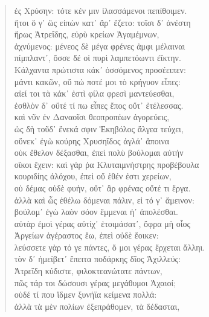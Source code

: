 \begin{Spacing}{1.5}
\begin{verse}
{\large\g  ἐς Χρύσην: τότε κέν μιν ἱλασσάμενοι πεπίθοιμεν.  } \\
{\large\g  ἤτοι ὅ γ᾽ ὣς εἰπὼν κατ᾽ ἄρ᾽ ἕζετο: τοῖσι δ᾽ ἀνέστη  } \\
{\large\g  ἥρως Ἀτρεΐδης, εὐρὺ κρείων Ἀγαμέμνων,  } \\
{\large\g  ἀχνύμενος: μένεος δὲ μέγα φρένες ἀμφι μέλαιναι  } \\
{\large\g  πίμπλαντ᾽, ὄσσε δέ οἱ πυρὶ λαμπετόωντι ἐΐκτην.  } \\
{\large\g  Κάλχαντα πρώτιστα κάκ᾽ ὀσσόμενος προσέειπεν:  } \\
{\large\g  μάντι κακῶν, οὔ πώ ποτέ μοι τὸ κρήγυον εἶπες:  } \\
{\large\g  αἰεί τοι τὰ κάκ᾽ ἐστὶ φίλα φρεσὶ μαντεύεσθαι,  } \\
{\large\g  ἐσθλὸν δ᾽ οὔτέ τί πω εἶπες ἔπος οὔτ᾽ ἐτέλεσσας.  } \\
{\large\g  καὶ νῦν ἐν Δαναοῖσι θεοπροπέων ἀγορεύεις,  } \\
{\large\g  ὡς δὴ τοῦδ᾽ ἕνεκά σφιν Ἑκηβόλος ἄλγεα τεύχει,  } \\
{\large\g  οὕνεκ᾽ ἐγὼ κούρης Χρυσηΐδος ἀγλά᾽ ἄποινα  } \\
{\large\g  οὐκ ἔθελον δέξασθαι, ἐπεὶ πολὺ βούλομαι αὐτήν  } \\
{\large\g  οἴκοι ἔχειν: καὶ γάρ ῥα Κλυταιμνήστρης προβέβουλα  } \\
{\large\g  κουριδίης ἀλόχου, ἐπεὶ οὔ ἑθέν ἐστι χερείων,  } \\
{\large\g  οὐ δέμας οὐδὲ φυήν, οὔτ᾽ ἂρ φρένας οὔτέ τι ἔργα.  } \\
{\large\g ἀλλὰ καὶ ὧς ἐθέλω δόμεναι πάλιν, εἰ τό γ᾽ ἄμεινον:   } \\
{\large\g  βούλομ᾽ ἐγὼ λαὸν σόον ἔμμεναι ἠ᾽ ἀπολέσθαι.  } \\
{\large\g  αὐτὰρ ἐμοὶ γέρας αὐτίχ᾽ ἑτοιμάσατ᾽, ὄφρα μὴ οἶος  } \\
{\large\g  Ἀργείων ἀγέραστος ἔω, ἐπεὶ οὐδὲ ἔοικεν:  } \\
{\large\g  λεύσσετε γὰρ τό γε πάντες, ὅ μοι γέρας ἔρχεται ἄλληι.  } \\
{\large\g  τὸν δ᾽ ἠμείβετ᾽ ἔπειτα ποδάρκης δῖος Ἀχιλλεύς:  } \\
{\large\g  Ἀτρεΐδη κύδιστε, φιλοκτεανώτατε πάντων,  } \\
{\large\g  πῶς τάρ τοι δώσουσι γέρας μεγάθυμοι Ἀχαιοί;  } \\
{\large\g  οὐδέ τί που ἴδμεν ξυνήϊα κείμενα πολλά:  } \\
{\large\g  ἀλλὰ τὰ μὲν πολίων ἐξεπράθομεν, τὰ δέδασται,  } \\

\end{verse}
\end{Spacing}
